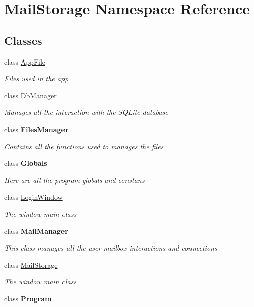 \hypertarget{namespace_mail_storage}{}\section{Mail\+Storage Namespace Reference}
\label{namespace_mail_storage}
\subsection*{Classes}
\begin{DoxyCompactItemize}
\item 
class \hyperlink{class_mail_storage_1_1_app_file}{App\+File}
\begin{DoxyCompactList}\small\item\em Files used in the app \end{DoxyCompactList}\item 
class \hyperlink{class_mail_storage_1_1_db_manager}{Db\+Manager}
\begin{DoxyCompactList}\small\item\em Manages all the interaction with the S\+Q\+Lite database \end{DoxyCompactList}\item 
class {\bfseries Files\+Manager}
\begin{DoxyCompactList}\small\item\em Contains all the functions used to manages the files \end{DoxyCompactList}\item 
class {\bfseries Globals}
\begin{DoxyCompactList}\small\item\em Here are all the program globals and constans \end{DoxyCompactList}\item 
class \hyperlink{class_mail_storage_1_1_login_window}{Login\+Window}
\begin{DoxyCompactList}\small\item\em The window main class \end{DoxyCompactList}\item 
class {\bfseries Mail\+Manager}
\begin{DoxyCompactList}\small\item\em This class manages all the user mailbox interactions and connections \end{DoxyCompactList}\item 
class \hyperlink{class_mail_storage_1_1_mail_storage}{Mail\+Storage}
\begin{DoxyCompactList}\small\item\em The window main class \end{DoxyCompactList}\item 
class {\bfseries Program}
\end{DoxyCompactItemize}
